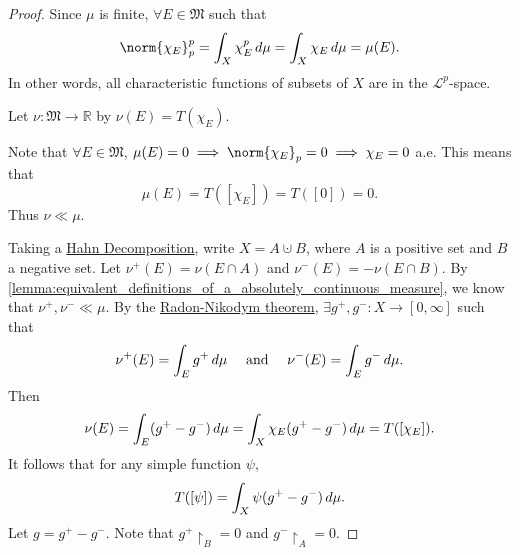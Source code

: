 \documentclass[notoc,notitlepage]{tufte-book}
\begin{document}
\begin{proof}

  \noindent
  Since $\mu$ is finite, $\forall E \in \mathfrak{M}$ such that
  \begin{equation*}
    \norm{\chi_E}_p^p = \int_{X} \chi_E^p \dif{\mu} = \int_{X} \chi_E \dif{\mu} = \mu(E).
  \end{equation*}
  In other words, all characteristic functions of subsets of $X$ are in the
  $\mathcal{L}^p$-space.

  Let $\nu : \mathfrak{M} \to \mathbb{R}$ by $\nu(E) = T(\chi_E)$.

  \noindent
   

  \noindent
  Note that $\forall E \in \mathfrak{M}$,
  $\mu(E) = 0 \implies \norm{\chi_E}_p = 0 \implies \chi_E = 0$ a.e.
  This means that
  \begin{equation*}
    \mu(E) = T([\chi_E]) = T([0]) = 0.
  \end{equation*}
  Thus $\nu \ll \mu$.

  Taking a \hyperref[thm:hahn_decomposition_theorem]{Hahn Decomposition},
  write $X = A \cupdot B$,
  where $A$ is a positive set and $B$ a negative set.
  Let $\nu^+(E) = \nu(E \cap A)$ and $\nu^-(E) = -\nu(E \cap B)$.
  By \cref{lemma:equivalent_definitions_of_a_absolutely_continuous_measure},
  we know that $\nu^+, \nu^- \ll \mu$.
  By the \hyperref[crly:a_corollary_to_radon_nikodym]{Radon-Nikodym theorem},
  $\exists g^+, g^- : X \to [0, \infty]$ such that
  \begin{equation*}
    \nu^+(E) = \int_{E} g^+ \mathop{}\!d{\mu} \quad\text{ and }\quad
    \nu^-(E) = \int_{E} g^- \mathop{}\!d{\mu}.
  \end{equation*}
  Then
  \begin{equation*}
    \nu(E) = \int_{E} (g^+ - g^-) \mathop{}\!d{\mu} = \int_{X} \chi_E (g^+ - g^-)
    \mathop{}\!d{\mu} = T([\chi_E]).
  \end{equation*}
  It follows that for any simple function $\psi$,
  \begin{equation}\label{eq:riesz_rep_1_eq1}
    T([\psi]) = \int_{X} \psi (g^+ - g^-) \mathop{}\!d{\mu}.
  \end{equation}
  Let $g = g^+ - g^-$.
  Note that $g^+ \restriction_B = 0$ and $g^- \restriction_A = 0$.


\end{proof}
\end{document}
